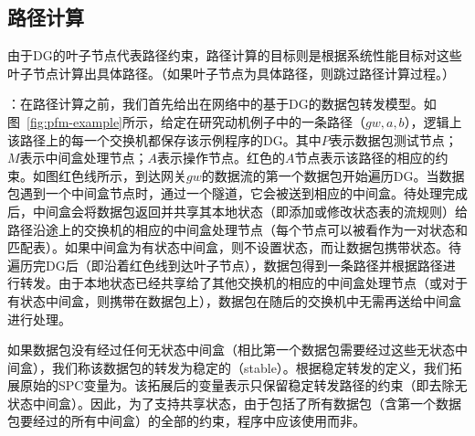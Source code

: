 
\subsection{路径计算}

由于DG的叶子节点代表路径约束，路径计算的目标则是根据系统性能目标对这些叶子节点计算出具体路径。（如果叶子节点为具体路径，则跳过路径计算过程。）


：在路径计算之前，我们首先给出在网络中的基于DG的数据包转发模型。如图~\ref{fig:pfm-example}所示，给定在研究动机例子中的一条路径（$gw, a, b$），逻辑上该路径上的每一个交换机都保存该示例程序的DG。其中$P$表示数据包测试节点；$M$表示中间盒处理节点；$A$表示操作节点。红色的$A$节点表示该路径的相应的约束。如图红色线所示，到达网关$gw$的数据流的第一个数据包开始遍历DG。当数据包遇到一个中间盒节点时，通过一个隧道，它会被送到相应的中间盒。待处理完成后，中间盒会将数据包返回并共享其本地状态（即添加或修改状态表的流规则）给路径沿途上的交换机的相应的中间盒处理节点（每个节点可以被看作为一对状态和匹配表）。如果中间盒为有状态中间盒，则不设置状态，而让数据包携带状态。待遍历完DG后（即沿着红色线到达叶子节点），数据包得到一条路径并根据路径进行转发。由于本地状态已经共享给了其他交换机的相应的中间盒处理节点（或对于有状态中间盒，则携带在数据包上），数据包在随后的交换机中无需再送给中间盒进行处理。

如果数据包没有经过任何无状态中间盒（相比第一个数据包需要经过这些无状态中间盒），我们称该数据包的转发为稳定的（stable）。根据稳定转发的定义，我们拓展原始的SPC变量为。该拓展后的变量表示只保留稳定转发路径的约束（即去除无状态中间盒）。因此，为了支持共享状态，由于包括了所有数据包（含第一个数据包要经过的所有中间盒）的全部的约束，程序中应该使用而非。


